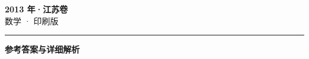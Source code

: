 \documentclass[zihao=5, a4paper]{ctexart}
\begin{document}
\begin{center}
  {\Large\bfseries 2013 年·江苏卷}\\[4pt]
  {\large 数学 · 印刷版}
\end{center}
\medskip
{}

\par\bigskip\hrule\bigskip
{}
\Needspace{0.55\textheight}
\begin{center}{\large\bfseries 参考答案与详细解析}\end{center}
\smallskip

\end{document}
